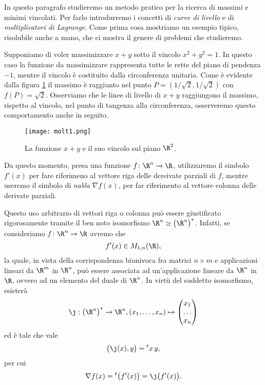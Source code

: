 In questo paragrafo studieremo un metodo pratico per la ricerca di massimi e minimi vincolati.
Per farlo introdurremo i concetti di \emph{curve di livello} e di \emph{moltiplicatori di Lagrange}.
Come prima cosa mostriamo un esempio tipico, risolubile anche a mano, che ci mostra il genere di problemi che studieremo.

\begin{ese}
	Supponiamo di voler massimizzare \(x+y\) sotto il vincolo \(x^2+y^2=1\).
	In questo caso la funzione da massimizzare rappresenta tutte le rette del piano di pendenza \(-1\), mentre il vincolo è costituito dalla circonferenza unitaria.
	Come è evidente dalla figura \ref{fig:molt1} il massimo è raggiunto nel punto \(P=(1/\sqrt{2},1/\sqrt{2})\) con \(f(P)=\sqrt{2}\).
	Osserviamo che le linee di livello di \(x+y\) raggiungono il massimo, rispetto al vincolo, nel punto di tangenza alla circonferenza, osserveremo questo comportamento anche in seguito.
\end{ese}

\begin{figure}[tp]
	\begin{centering}
		\texttt{[image: molt1.png]}
		\caption{La funzione \(x+y\) e il suo vincolo sul piano \(\R^2\).}
		\label{fig:molt1}
	\end{centering}
\end{figure}

\begin{notz}
	Da questo momento, presa una funzione \(f\colon \R^n\to \R\), utilizzaremo il simbolo \(f'(x)\) per fare riferimeno al vettore riga delle dereivate parziali di \(f\), mentre useremo il simbolo di \emph{nabla} \(\nabla f(x)\), per far riferimento al vettore colonna delle derivate parziali.
\end{notz}

\begin{oss}
	Questo uso arbitrario di vettori riga o colonna può essere giustificato rigorosamente tramite il ben noto isomorfismo \(\R^n\simeq\big(\R^n\big)^*\).
	Infatti, se consideriamo \(f\colon\R^n\to\R\) avremo che
	\[
		f'(x)\in M_{1,n}(\R),
	\]
	la quale, in vista della corrispondenza biunivoca fra matrici \(n\times m\) e applicazioni lineari da \(\R^m\) in \(\R^n\), può essere associata ad un'applicazione lineare da \(\R^n\) in \(\R\), ovvero ad un elemento del duale di \(\R^n\).
	In virtù del suddetto isomorfismo, esisterà
	\[
		\j:\big(\R^n\big)^*\to\R^n,(x_1,\dots,x_n)\mapsto
		\begin{pmatrix}
			x_1   \\
			\dots \\
			x_n
		\end{pmatrix}
	\]
	ed è tale che vale
	\[
		\big(\j(x),y\big)={}^{t}x\,y,
	\]
	per cui
	\[
		\nabla f(x)={}^{t}\big(f'(x)\big)=\j\big(f'(x)\big).
	\]
\end{oss}

